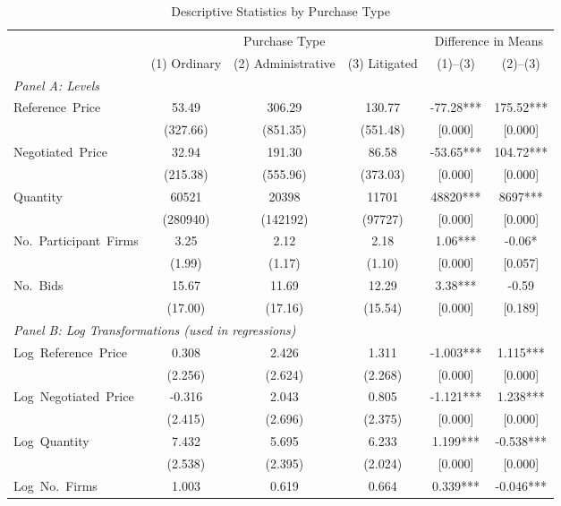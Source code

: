 \begin{table}[ht]
  \centering
  \caption{Descriptive Statistics by Purchase Type}
  \label{tab:desc_stats}
  \small
  \begin{threeparttable}
  \begin{tabular}{lccccc}
    \hline\hline
    & \multicolumn{3}{c}{Purchase Type} & \multicolumn{2}{c}{Difference in Means} \\
    \cmidrule(lr){2-4} \cmidrule(lr){5-6}
    & (1) Ordinary & (2) Administrative & (3) Litigated & (1)--(3) & (2)--(3) \\
    \hline
    \multicolumn{6}{l}{\textit{Panel A: Levels}} \\[3pt]
    Reference~Price & 53.49 & 306.29 & 130.77 & -77.28*** & 175.52*** \\
    & (327.66) & (851.35) & (551.48) & [0.000] & [0.000] \\[3pt]
    Negotiated~Price & 32.94 & 191.30 & 86.58 & -53.65*** & 104.72*** \\
    & (215.38) & (555.96) & (373.03) & [0.000] & [0.000] \\[3pt]
    Quantity & 60521 & 20398 & 11701 & 48820*** & 8697*** \\
    & (280940) & (142192) & (97727) & [0.000] & [0.000] \\[3pt]
    No.~Participant~Firms & 3.25 & 2.12 & 2.18 & 1.06*** & -0.06* \\
    & (1.99) & (1.17) & (1.10) & [0.000] & [0.057] \\[3pt]
    No.~Bids & 15.67 & 11.69 & 12.29 & 3.38*** & -0.59 \\
    & (17.00) & (17.16) & (15.54) & [0.000] & [0.189] \\[3pt]
    \hline
    \multicolumn{6}{l}{\textit{Panel B: Log Transformations (used in regressions)}} \\[3pt]
    Log~Reference~Price & 0.308 & 2.426 & 1.311 & -1.003*** & 1.115*** \\
    & (2.256) & (2.624) & (2.268) & [0.000] & [0.000] \\[3pt]
    Log~Negotiated~Price & -0.316 & 2.043 & 0.805 & -1.121*** & 1.238*** \\
    & (2.415) & (2.696) & (2.375) & [0.000] & [0.000] \\[3pt]
    Log~Quantity & 7.432 & 5.695 & 6.233 & 1.199*** & -0.538*** \\
    & (2.538) & (2.395) & (2.024) & [0.000] & [0.000] \\[3pt]
    Log~No.~Firms & 1.003 & 0.619 & 0.664 & 0.339*** & -0.046*** \\

\end{tabular}
\end{threeparttable}
\end{table}
